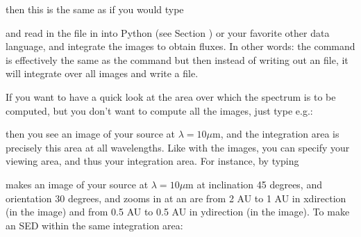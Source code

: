 \documentclass[letterpaper,10pt,english]{sphinxmanual}
\begin{document}
then this is the same as if you would type

\begin{sphinxVerbatim}[commandchars=\\\{\}]
          
\end{sphinxVerbatim}

and read in the file  in into Python (see Section
{\hyperref[\detokenize{imagesspectra:sec-multi-wavelength-images}]{}}) or your favorite other data language, and
integrate the images to obtain fluxes. In other words: the command 
is effectively the same as the command  but then instead of writing out
an  file, it will integrate over all images and write a
 file.

If you want to have a quick look at the area over which the spectrum is to be
computed, but you don’t want to compute all the images, just type e.g.:

\begin{sphinxVerbatim}[commandchars=\\\{\}]
       
\end{sphinxVerbatim}

then you see an image of your source at \(\lambda=10\mu\)m, and the
integration area is precisely this area \sphinxhyphen{} at all wavelengths. Like with the
images, you can specify your viewing area, and thus your integration area. For
instance, by typing

\begin{sphinxVerbatim}[commandchars=\\\{\}]
            
\end{sphinxVerbatim}

makes an image of your source at \(\lambda=10\mu\)m at inclination 45
degrees, and orientation 30 degrees, and zooms in at an are from \sphinxhyphen{}2 AU to \sphinxhyphen{}1 AU
in x\sphinxhyphen{}direction (in the image) and from \sphinxhyphen{}0.5 AU to 0.5 AU in y\sphinxhyphen{}direction (in the
image). To make an SED within the same integration area:
\end{document}
